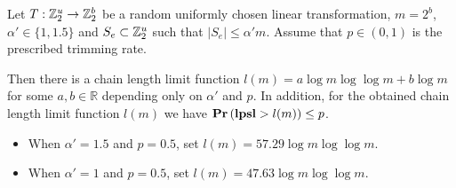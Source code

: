 \begin{theorem}
\label{theorem-model-chain-limit-rule}
Let $T: \mathbb{Z}_{2}^{u} \rightarrow \mathbb{Z}_{2}^{b}$ be a random uniformly chosen linear transformation, $m = 2 ^ b$, $\alpha' \in \{1, 1.5\}$ and $S_e \subset \mathbb{Z}_{2}^{u}$ such that $|S_e| \leq \alpha' m$. Assume that $p \in (0, 1)$ is the prescribed trimming rate.

Then there is a chain length limit function $l(m) = a \log m \log \log m + b \log m$ for some $a, b \in \mathbb{R}$ depending only on $\alpha'$ and $p$. In addition, for the obtained chain length limit function $l(m)$ we have $\mathbf{Pr}\left(\mathbf{lpsl} > l(m)\right) \leq p$.

\begin{itemize}
\item When $\alpha' = 1.5$ and $p = 0.5$, set $l(m) = 57.29 \log m \log \log m$.
\item When $\alpha' = 1$ and $p = 0.5$, set $l(m) = 47.63 \log m \log \log m$.
\end{itemize}
\end{theorem}
